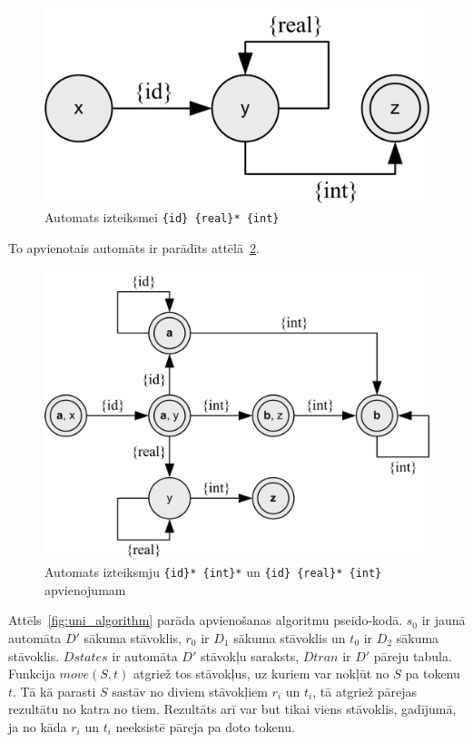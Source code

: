 \begin{figure}[H]
  \centering
    \includegraphics[scale=1.5]{pictures/auto_m_2}
  \caption{\label{fig:auto_m_2}Automats izteiksmei \texttt{\{id\} \{real\}* \{int\}}}
\end{figure}

To apvienotais automāts ir parādīts attēlā~\ref{fig:auto_merge}.

\begin{figure}[H]
  \centering
    \includegraphics[scale=1.5]{pictures/auto_merge}
  \caption{\label{fig:auto_merge}Automats izteiksmju \texttt{\{id\}* \{int\}*} un \texttt{\{id\} \{real\}* \{int\}} apvienojumam}
\end{figure}

Attēls~\ref{fig:uni_algorithm} parāda apvienošanas algoritmu pseido-kodā. $s_0$ ir jaunā automāta $D'$ sākuma stāvoklis, $r_0$ ir $D_1$ sākuma stāvoklis un $t_0$ ir $D_2$ sākuma stāvoklis. $Dstates$ ir automāta $D'$ stāvokļu saraksts, $Dtran$ ir $D'$ pāreju tabula. Funkcija $move (S, t)$ atgriež tos stāvokļus, uz kuriem var nokļūt no $S$ pa tokenu $t$. Tā kā parasti $S$ sastāv no diviem stāvokļiem $r_i$ un $t_i$, tā atgriež pārejas rezultātu no katra no tiem. Rezultāts arī var but tikai viens stāvoklis, gadījumā, ja no kāda $r_i$ un $t_i$ neeksistē pāreja pa doto tokenu.

